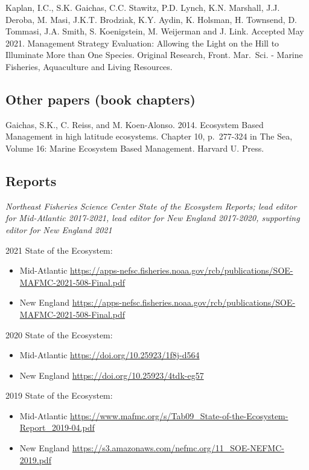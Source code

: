 \documentclass[11pt, a4paper]{awesome-cv}
\providecommand{\tightlist}{%
	\setlength{\itemsep}{0pt}\setlength{\parskip}{0pt}}
\begin{document}
Kaplan, I.C., S.K. Gaichas, C.C. Stawitz, P.D. Lynch, K.N. Marshall,
J.J. Deroba, M. Masi, J.K.T. Brodziak, K.Y. Aydin, K. Holsman, H.
Townsend, D. Tommasi, J.A. Smith, S. Koenigstein, M. Weijerman and J.
Link. Accepted May 2021. Management Strategy Evaluation: Allowing the
Light on the Hill to Illuminate More than One Species. Original
Research, Front. Mar.~Sci. - Marine Fisheries, Aquaculture and Living
Resources.

\hypertarget{other-papers-book-chapters}{%
\subsection{Other papers (book
chapters)}\label{other-papers-book-chapters}}

Gaichas, S.K., C. Reiss, and M. Koen-Alonso. 2014. Ecosystem Based
Management in high latitude ecosystems. Chapter 10, p.~277-324 in The
Sea, Volume 16: Marine Ecosystem Based Management. Harvard U. Press.

\hypertarget{reports}{%
\subsection{Reports}\label{reports}}

\emph{Northeast Fisheries Science Center State of the Ecosystem Reports;
lead editor for Mid-Atlantic 2017-2021, lead editor for New England
2017-2020, supporting editor for New England 2021}

2021 State of the Ecosystem:

\begin{itemize}
\tightlist
\item
  Mid-Atlantic
  \url{https://apps-nefsc.fisheries.noaa.gov/rcb/publications/SOE-MAFMC-2021-508-Final.pdf}
\item
  New England
  \url{https://apps-nefsc.fisheries.noaa.gov/rcb/publications/SOE-MAFMC-2021-508-Final.pdf}
\end{itemize}

2020 State of the Ecosystem:

\begin{itemize}
\tightlist
\item
  Mid-Atlantic \url{https://doi.org/10.25923/1f8j-d564}
\item
  New England \url{https://doi.org/10.25923/4tdk-eg57}
\end{itemize}

2019 State of the Ecosystem:

\begin{itemize}
\tightlist
\item
  Mid-Atlantic
  \url{https://www.mafmc.org/s/Tab09_State-of-the-Ecosystem-Report_2019-04.pdf}
\item
  New England
  \url{https://s3.amazonaws.com/nefmc.org/11_SOE-NEFMC-2019.pdf}
\end{itemize}
\end{document}
